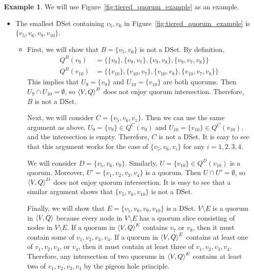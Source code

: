 \documentclass[12pt, psamsfonts]{amsart}
\theoremstyle{definition}
\newtheorem{exmp}[thm]{Example}
\theoremstyle{remark}
\numberwithin{equation}{subsection}
\begin{document}
\begin{exmp}
    We will use Figure~\ref{fig:tiered_quorum_example} as an example.

    \begin{itemize}
        \item
            The smallest DSet containing $v_5, v_6$ in Figure~\ref{fig:tiered_quorum_example} is $\{ v_5, v_6, v_9, v_{10} \}$.
            \begin{itemize}
                \item
                    First, we will show that $B = \{ v_5, v_6 \}$ is not a DSet.
                    By definition,
                    \begin{align*}
                        Q^B(v_9) &= \{ \{ v_9 \}, \{ v_9, v_7 \}, \{ v_9, v_8 \}, \{ v_9, v_7, v_8 \} \} \\
                        Q^B(v_{10}) &= \{ \{ v_{10} \}, \{ v_{10}, v_7 \}, \{ v_{10}, v_8 \}, \{ v_{10}, v_7, v_8 \} \}
                    \end{align*}
                    This implies that $U_9 = \{ v_9 \}$ and $U_{10} = \{ v_{10} \}$ are both quorums.
                    Then $U_9 \cap U_{10} = \emptyset$, so $\ev{V, Q}^B$ does not enjoy quorum intersection.
                    Therefore, $B$ is not a DSet.

                    Next, we will consider $C = \{ v_5, v_6, v_1 \}$.
                    Then we can use the same argument as above.
                    $U_9 = \{ v_9 \} \in Q^C(v_9)$ and $U_{10} = \{ v_{10} \} \in Q^C(v_{10})$, and the intersection is empty.
                    Therefore, $C$ is not a DSet.
                    It is easy to see that this argument works for the case of $\{ v_5, v_6, v_i \}$ for any $i = 1, 2, 3, 4$.

                    We will consider $D = \{ v_5, v_6, v_9 \}$.
                    Similarly, $U = \{ v_{10} \} \in Q^D(v_{10})$ is a quorum.
                    Moreover, $U' = \{ v_1, v_2, v_3, v_4 \}$ is a quorum.
                    Then $U \cap U' = \emptyset$, so $\ev{V, Q}^D$ does not enjoy quorum intersection.
                    It is easy to see that a similar argument shows that $\{ v_5, v_6, v_{10} \}$ is not a DSet.

                    Finally, we will show that $E = \{ v_5, v_6, v_9, v_{10} \}$ is a DSet.
                    $V \setminus E$ is a quorum in $\ev{V, Q}$ because every node in $V \setminus E$ has a quorum slice consisting of nodes in $V \setminus E$.
                    If a quorum in $\ev{V, Q}^E$ contains $v_7$ or $v_8$, then it must contain some of $v_1, v_2, v_3, v_4$.
                    If a quorum in $\ev{V, Q}^E$ contains at least one of $v_1, v_2, v_3$, or $v_4$, then it must contain at least three of $v_1, v_2, v_3, v_4$.
                    Therefore, any intersection of two quorums in $\ev{V, Q}^E$ contains at least two of $v_1, v_2, v_3, v_4$ by the pigeon hole principle.


\end{itemize}
\end{itemize}
\end{exmp}
\end{document}
